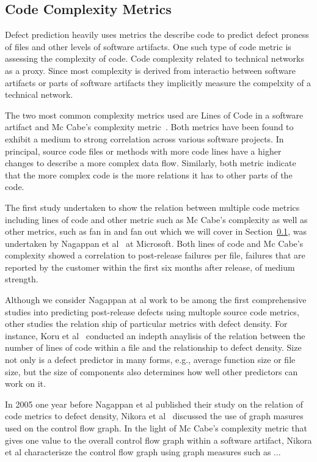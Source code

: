 \subsection{Code Complexity Metrics}
Defect prediction heavily uses metrics the describe code to predict defect proness of files and other levels of software artifacts.
One such type of code metric is assessing the complexity of code.
Code complexity related to technical networks as a proxy.
Since most complexity is derived from interactio between software artifacts or parts of software artifacts they implicitly measure the compelxity of a technical network.

The two most common complexity metrics used are Lines of Code in a software artifact and Mc Cabe's complexity metric~\cite{}.
Both metrics have been found to exhibit a medium to strong correlation across various software projects.
In principal, source code files or methods with more code lines have a higher changes to describe a more complex data flow.
Similarly, both metric indicate that the more complex code is the more relations it has to other parts of the code.

The first study undertaken to show the relation between multiple code metrics including lines of code and other metric such as Mc Cabe's complexity as well as other metrics, such as fan in and fan out which we will cover in Section~\ref{}, was undertaken by Nagappan et al~\cite{nagappan:icse:2006} at Microsoft.
Both lines of code and Mc Cabe's complexity showed a correlation to post-release failures per file, failures that are reported by the customer within the first six months after release, of medium strength.

Although we consider Nagappan at al work to be among the first comprehensive studies into predicting post-release defects using multople source code metrics, other studies the relation ship of particular metrics with defect density.
For instance, Koru et al~\cite{koru:promise:2005} conducted an indepth anaylisis of the relation between the number of lines of code within a file and the relationship to defect density.
Size not only is a defect predictor in many forms, e.g., average function size or file size, but the size of components also determines how well other predictors can work on it.

In 2005 one year before Nagappan et al published their study on the relation of code metrics to defect density, Nikora et al~\cite{nikora:isese:2006} discussed the use of graph masures used on the control flow graph.
In the light of Mc Cabe's complexity metric that gives one value to the overall control flow graph within a software artifact, Nikora et al characterisze the control flow graph using graph measures such as ...

